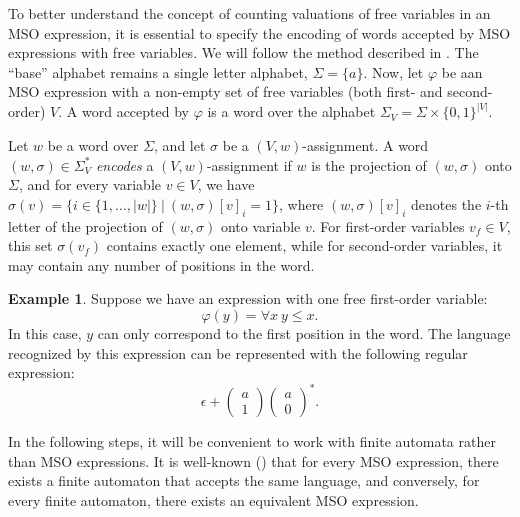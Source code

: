 \documentclass[12pt]{article}
\newcommand{\icol}[1]{%
  \left(\begin{smallmatrix}#1\end{smallmatrix}\right)%
}
\theoremstyle{definition}
\newtheorem{example}{Example}[section]
\begin{document}
To better understand the concept of counting valuations of free variables in an MSO expression, it is essential to specify the encoding of words accepted by MSO expressions with free variables. We will follow the method described in \cite{KreutzerR13}. The ``base'' alphabet remains a single letter alphabet, $\Sigma = \{a\}$. Now, let $\varphi$ be aan MSO expression with a non-empty set of free variables (both first- and second-order) $V$. A word accepted by $\varphi$ is a word over the alphabet $\Sigma_V = \Sigma \times \{0, 1\}^{|V|}$. 

Let $w$ be a word over $\Sigma$, and let $\sigma$ be a $(V, w)$-assignment. A word $(w, \sigma) \in \Sigma_V^*$ \emph{encodes} a $(V, w)$-assignment if $w$ is the projection of $(w, \sigma)$ onto $\Sigma$, and for every variable $v \in V$, we have $\sigma(v) = \{i \in \{1,\ldots,|w|\} \ | \ (w, \sigma)[v]_i = 1 \}$, where $(w, \sigma)[v]_i$ denotes the $i$-th letter of the projection of $(w, \sigma)$ onto variable $v$. For first-order variables $v_f \in V$, this set $\sigma(v_f)$ contains exactly one element, while for second-order variables, it may contain any number of positions in the word.

\begin{example}
    Suppose we have an expression with one free first-order variable:
    $$\varphi(y) = \forall x \ y \leq x.$$
    In this case, $y$ can only correspond to the first position in the word. The language recognized by this expression can be represented with the following regular expression: 
    $$\epsilon + \icol{a\\1}\icol{a\\0}^*.$$
\end{example}

In the following steps, it will be convenient to work with finite automata rather than MSO expressions. It is well-known (\cite{Buchi1960}) that for every MSO expression, there exists a finite automaton that accepts the same language, and conversely, for every finite automaton, there exists an equivalent MSO expression.
\end{document}
